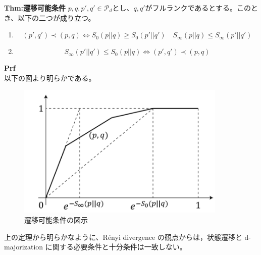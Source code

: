 \documentclass[a4paper,11pt]{jsarticle}
\numberwithin{equation}{section}
\begin{document}
\begin{itembox}[l]{\textbf{Thm:遷移可能条件}}
    $p,q,p',q' \in \mathcal{P}_d$とし、$q,q'$がフルランクであるとする。このとき、以下の二つが成り立つ。
    \begin{enumerate}
        \item
        \begin{equation}
            (p',q') \prec (p,q) \Leftrightarrow S_0(p||q) \geq S_0(p'||q') \quad S_{\infty}(p||q) \leq S_{\infty}(p'||q')
        \end{equation}
        \item
        \begin{equation}
            S_{\infty}(p'||q') \leq S_{0}(p||q) \Leftrightarrow (p',q') \prec (p,q)
        \end{equation}
    \end{enumerate}

\end{itembox}
\textbf{Prf}\\
以下の図より明らかである。%
\begin{figure}[H]
    \begin{center}
    \includegraphics[width=100mm]{image3.png}
    \end{center}
    \caption{遷移可能条件の図示}
    \label{fig:three}
\end{figure}
上の定理から明らかなように、Rényi divergence の観点からは，状態遷移と d-majorization に関する必要条件と十分条件は一致しない。\\
\end{document}
